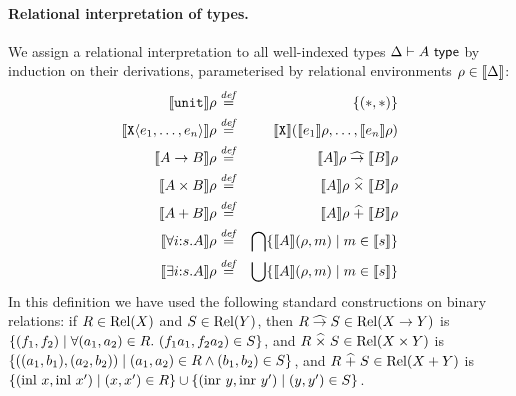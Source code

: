 \paragraph{Relational interpretation of types.}
We assign a relational interpretation to all well-indexed types $\Delta
\vdash A \textup{\textsf{ type}}$ by induction on their derivations, parameterised by
relational environments 
$\rho \in \llbracket \Delta \rrbracket$:
\begin{eqnarray*}
  \llbracket \texttt{unit} \rrbracket \rho & \stackrel{\mathit{def}}= & \{(*,*)\} \\
  \llbracket \textup{\texttt{X}}\langle e_1,\ldots,e_n \rangle \rrbracket\rho & \stackrel{\mathit{def}}= & 
  \llbracket \textup{\texttt{X}} \rrbracket (\llbracket e_1 \rrbracket\rho, \ldots,
  \llbracket e_n \rrbracket\rho)\\
  \llbracket A \to B \rrbracket \rho & \stackrel{\mathit{def}}= & \llbracket A \rrbracket\rho \mathrel{\widehat\to} \llbracket B \rrbracket \rho \\
  \llbracket A \times B \rrbracket\rho & \stackrel{\mathit{def}}= & \llbracket A \rrbracket \rho \mathrel{\widehat\times} \llbracket B \rrbracket \rho \\
  \llbracket A + B \rrbracket \rho & \stackrel{\mathit{def}}= & \llbracket A \rrbracket \rho \mathrel{\widehat+} \llbracket B \rrbracket \rho \\
  \llbracket \forall i\mathord:s.A \rrbracket \rho & \stackrel{\mathit{def}}= & 
  \bigcap\{ \llbracket A \rrbracket {(\rho,m)} \mathrel| m \in \llbracket s \rrbracket \} \\
  \llbracket \exists i\mathord:s.A \rrbracket \rho & \stackrel{\mathit{def}}= & 
  \bigcup\{ \llbracket A \rrbracket {(\rho,m)} \mathrel| m \in \llbracket s \rrbracket \}
\end{eqnarray*}
In this definition we have used the following standard %
constructions on binary relations: if $R \in \mathrm{Rel}(X)$ and $S \in
\mathrm{Rel}(Y)$, then $R \mathrel{\widehat\to} S \in \mathrm{Rel}(X \to Y)$ is %
$\{(f_1,f_2) \mathrel| \forall (a_1,a_2) \in R.\ (f_1a_1,f_2a_2) \in S
\}$, and %
$R
\mathrel{\widehat\times} S \in \mathrm{Rel}(X \times Y)$ is %
$\{((a_1,b_1),(a_2,b_2)) \mathrel| (a_1,a_2) \in R \land (b_1,b_2) \in S
\}$, and %
$R \mathrel{\widehat+} S \in \mathrm{Rel}(X + Y)$ is %
$\{ (\mathrm{inl}\ x, \mathrm{inl}\ x') \mathrel| (x,x') \in R \} \cup
\{ (\mathrm{inr}\ y, \mathrm{inr}\ y') \mathrel| (y,y') \in S \}$.

